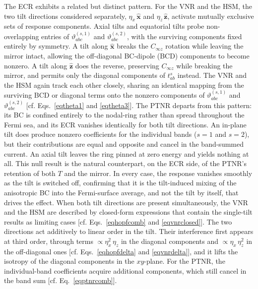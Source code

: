\documentclass[aps,prb,onecolumn,nofootinbib,citeautoscript,10pt]{revtex4-2}
\newcommand{\bs}[1]{\boldsymbol{#1}}
\begin{document}
The ECR exhibits a related but distinct pattern. For the VNR and the HSM, the two tilt directions considered separately, $\eta_x\,\bs{\hat x}$ and $\eta_z\,\bs{\hat z}$, activate mutually exclusive sets of response components. Axial tilts and equatorial tilts probe non-overlapping entries of $\vartheta^{(s,1)}_{abc}$ and $\vartheta^{(s,2)}_{abc}$, with the surviving components fixed entirely by symmetry. A tilt along $\bs{\hat x}$ breaks the $C_{\infty z}$ rotation while leaving the mirror intact, allowing the off-diagonal BC-dipole (BCD) components to become nonzero. A tilt along $\bs{\hat z}$ does the reverse, preserving $C_{\infty z}$ while breaking the mirror, and permits only the diagonal components of $t^s_{ab}$ instead. The VNR and the HSM again track each other closely, sharing an identical mapping from the surviving BCD or diagonal terms onto the nonzero components of $\vartheta^{(s,1)}_{abc}$ and $\vartheta^{(s,2)}_{abc}$ [cf. Eqs.~\eqref{eqtheta1} and \eqref{eqtheta3}]. The PTNR departs from this pattern: its BC is confined entirely to the nodal-ring rather than spread throughout the Fermi sea, and its ECR vanishes identically for both tilt directions. An in-plane tilt does produce nonzero coefficients for the individual bands ($s=1$ and $s=2$), but their contributions are equal and opposite and cancel in the band-summed current. An axial tilt leaves the ring pinned at zero energy and yields nothing at all. This null result is the natural counterpart, on the ECR side, of the PTNR's retention of both $T$ and the mirror. In every case, the response vanishes smoothly as the tilt is switched off, confirming that it is the tilt-induced mixing of the anisotropic BC into the Fermi-surface average, and not the tilt by itself, that drives the effect. When both tilt directions are present simultaneously, the VNR and the HSM are described by closed-form expressions that contain the single-tilt results as limiting cases [cf. Eqs.~\eqref{eqhopfcomb} and \eqref{eqvnrclosed}]. The two directions act additively to linear order in the tilt. Their interference first appears at third order, through terms $\propto\eta_x^2\,\eta_z$ in the diagonal components and $\propto\eta_x\,\eta_z^2$ in the off-diagonal ones [cf. Eqs.~\eqref{eqhopfdelta} and \eqref{eqvnrdelta}], and it lifts the isotropy of the diagonal components in the $xy$-plane. For the PTNR, the individual-band coefficients acquire additional components, which still cancel in the band sum [cf. Eq.~\eqref{eqptnrcomb}].
\end{document}
